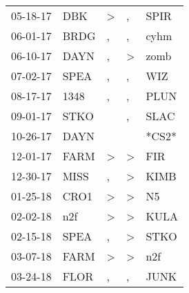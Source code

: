 \begin{supertabular}{p{0.07\textwidth}p{0.06\textwidth}p{0.02\textwidth}p{0.02\textwidth}p{0.06\textwidth}}
          05-18-17\textsuperscript{} &            DBK\textsuperscript{} &     \textgreater &                , &           SPIR\textsuperscript{} \\
          06-01-17\textsuperscript{} &           BRDG\textsuperscript{} &                , &                , &           cyhm\textsuperscript{} \\
          06-10-17\textsuperscript{} &           DAYN\textsuperscript{} &                , &     \textgreater &           zomb\textsuperscript{} \\
          07-02-17\textsuperscript{} &           SPEA\textsuperscript{} &                , &                , &            WIZ\textsuperscript{} \\
          08-17-17\textsuperscript{} &           1348\textsuperscript{} &                , &                , &           PLUN\textsuperscript{} \\
          09-01-17\textsuperscript{} &           STKO\textsuperscript{} &                  &                , &           SLAC\textsuperscript{} \\
          10-26-17\textsuperscript{} &           DAYN\textsuperscript{} &                  &                  &                            *CS2* \\
          12-01-17\textsuperscript{} &           FARM\textsuperscript{} &     \textgreater &     \textgreater &            FIR\textsuperscript{} \\
          12-30-17\textsuperscript{} &           MISS\textsuperscript{} &                , &     \textgreater &           KIMB\textsuperscript{} \\
          01-25-18\textsuperscript{} &           CRO1\textsuperscript{} &     \textgreater &     \textgreater &             N5\textsuperscript{} \\
          02-02-18\textsuperscript{} &            n2f\textsuperscript{} &     \textgreater &     \textgreater &           KULA\textsuperscript{} \\
          02-15-18\textsuperscript{} &           SPEA\textsuperscript{} &                , &     \textgreater &           STKO\textsuperscript{} \\
          03-07-18\textsuperscript{} &           FARM\textsuperscript{} &     \textgreater &     \textgreater &            n2f\textsuperscript{} \\
          03-24-18\textsuperscript{} &           FLOR\textsuperscript{} &                , &                , &           JUNK\textsuperscript{} \\

\end{supertabular}
